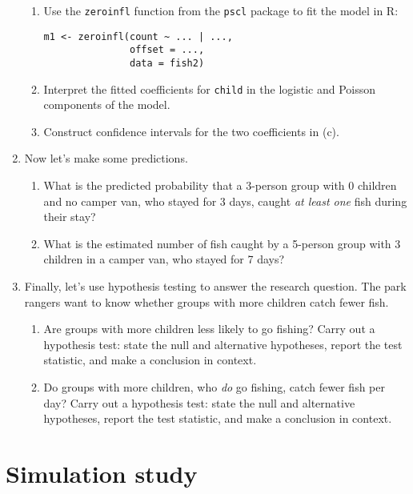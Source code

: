 \documentclass[11pt]{article}
\begin{document}
\begin{enumerate}
\begin{enumerate}
\item Use the \texttt{zeroinfl} function from the \texttt{pscl} package to fit the model in R:

\begin{verbatim}
m1 <- zeroinfl(count ~ ... | ...,
               offset = ...,
               data = fish2)
\end{verbatim}

\item Interpret the fitted coefficients for \texttt{child} in the logistic and Poisson components of the model.

\item Construct confidence intervals for the two coefficients in (c).
\end{enumerate}

\item Now let's make some predictions.

\begin{enumerate}
\item What is the predicted probability that a 3-person group with 0 children and no camper van, who stayed for 3 days, caught \textit{at least one} fish during their stay?

\item What is the estimated number of fish caught by a 5-person group with 3 children in a camper van, who stayed for 7 days?
\end{enumerate}

\item Finally, let's use hypothesis testing to answer the research question. The park rangers want to know whether groups with more children catch fewer fish.

\begin{enumerate}
\item Are groups with more children less likely to go fishing? Carry out a hypothesis test: state the null and alternative hypotheses, report the test statistic, and make a conclusion in context.

\item Do groups with more children, who \textit{do} go fishing, catch fewer fish per day? Carry out a hypothesis test: state the null and alternative hypotheses, report the test statistic, and make a conclusion in context.
\end{enumerate}

\end{enumerate}

\newpage

\section*{Simulation study}
\end{document}
